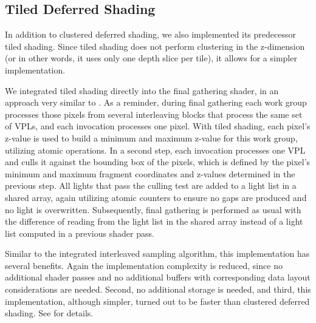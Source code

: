 \subsection{Tiled Deferred Shading}

In addition to clustered deferred shading, we also implemented its predecessor tiled shading. Since tiled shading does not perform clustering in the z-dimension (or in other words, it uses only one depth slice per tile), it allows for a simpler implementation.

We integrated tiled shading directly into the final gathering shader, in an approach very similar to \citet{Andersson:2011:RenderingBattlefield3}. As a reminder, during final gathering each work group processes those pixels from several interleaving blocks that process the same set of VPLs, and each invocation processes one pixel. With tiled shading, each pixel's z-value is used to build a minimum and maximum z-value for this work group, utilizing atomic operations. In a second step, each invocation processes one VPL and culls it against the bounding box of the pixels, which is defined by the pixel's minimum and maximum fragment coordinates and z-values determined in the previous step. All lights that pass the culling test are added to a light list in a shared array, again utilizing atomic counters to ensure no gaps are produced and no light is overwritten. Subsequently, final gathering is performed as usual with the difference of reading from the light list in the shared array instead of a light list computed in a previous shader pass.

Similar to the integrated interleaved sampling algorithm, this implementation has several benefits. Again the implementation complexity is reduced, since no additional shader passes and no additional buffers with corresponding data layout considerations are needed. Second, no additional storage is needed, and third, this implementation, although simpler, turned out to be faster than clustered deferred shading. See  for details.

